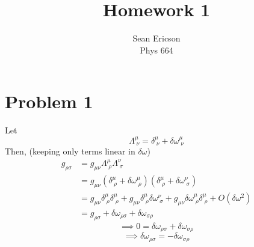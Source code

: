 \documentclass[12pt]{article}
\begin{document}
\title{Homework 1}
\author{Sean Ericson \\ Phys 664}
\maketitle

\section*{Problem 1}
Let
\[ \Lambda_{\;\nu}^{\mu} = \delta_{\;\nu}^{\mu} + \delta\omega_{\;\nu}^{\mu} \]
Then, (keeping only terms linear in $\delta\omega$)
\begin{align*}
    g_{\rho\sigma} &= g_{\mu\nu}\Lambda_{\;\rho}^\mu\Lambda_{\;\sigma}^\nu \\
    &= g_{\mu\nu}\left(\delta_{\;\rho}^\mu + \delta\omega_{\;\rho}^\mu\right)\left(\delta_{\;\rho}^\mu + \delta\omega_{\;\sigma}^\nu\right) \\
    &= g_{\mu\nu}\delta_{\;\rho}^\mu\delta_{\;\rho}^\mu + g_{\mu\nu}\delta_{\;\rho}^\mu\delta\omega_{\;\sigma}^\nu + g_{\mu\nu}\delta\omega_{\;\rho}^\mu\delta_{\;\rho}^\mu + O(\delta\omega^2)\\
    &= g_{\rho\sigma} + \delta\omega_{\rho\sigma} + \delta\omega_{\sigma\rho}
\end{align*}
\[ \implies 0 = \delta\omega_{\rho\sigma} + \delta\omega_{\sigma\rho} \]
\[ \implies \boxed{\delta\omega_{\rho\sigma} = -\delta\omega_{\sigma\rho}} \]
\end{document}
